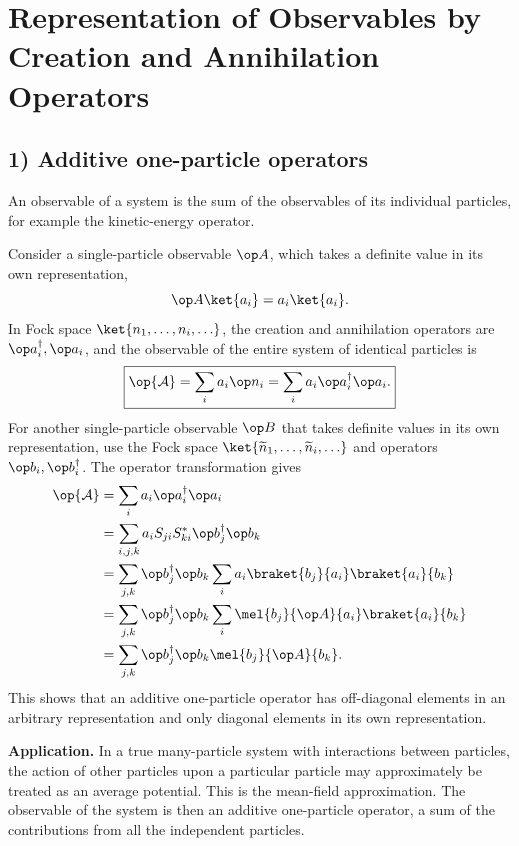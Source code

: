 \section{Representation of Observables by Creation and Annihilation Operators}
\subsection*{1) Additive one-particle operators}
An observable of a system is the sum of the observables of its individual particles, for example the kinetic-energy operator.

Consider a single-particle observable $\op A$, which takes a definite value in its own representation,
\[\op A\ket{a_i}=a_i\ket{a_i}.\]
In Fock space $\ket{n_1,\ldots,n_i,\ldots}$, the creation and annihilation operators are $\op a_i^\dagger,\op a_i$, and the observable of the entire system of identical particles is
\[\boxed{\op{\mathcal A}=\sum_i a_i\op n_i
=\sum_i a_i\op a_i^\dagger\op a_i.}\]
For another single-particle observable $\op B$ that takes definite values in its own representation, use the Fock space $\ket{\widetilde n_1,\ldots,\widetilde n_i,\ldots}$ and operators $\op b_i,\op b_i^\dagger$. The operator transformation gives
\begin{align*}
\op{\mathcal A}
&=\sum_i a_i\op a_i^\dagger\op a_i\\
&=\sum_{i,j,k}a_iS_{ji}S_{ki}^*\op b_j^\dagger\op b_k\\
&=\sum_{j,k}\op b_j^\dagger\op b_k
\sum_i a_i\braket{b_j}{a_i}\braket{a_i}{b_k}\\
&=\sum_{j,k}\op b_j^\dagger\op b_k
\sum_i\mel{b_j}{\op A}{a_i}\braket{a_i}{b_k}\\
&=\sum_{j,k}\op b_j^\dagger\op b_k\mel{b_j}{\op A}{b_k}.
\end{align*}
This shows that an additive one-particle operator has off-diagonal elements in an arbitrary representation and only diagonal elements in its own representation.

\textbf{Application.} In a true many-particle system with interactions between particles, the action of other particles upon a particular particle may approximately be treated as an average potential. This is the mean-field approximation. The observable of the system is then an additive one-particle operator, a sum of the contributions from all the independent particles.

